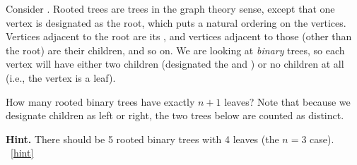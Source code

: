 \documentclass{book}
\begin{document}
\setcounter{project}{177}
\addtocounter{project}{-1}
\begin{activity}[]\label{act-rootedtrees}
\hypertarget{p-1043}{}%
Consider .  Rooted trees are trees in the graph theory sense, except that one vertex is designated as the root, which puts a natural ordering on the vertices.  Vertices adjacent to the root are its , and vertices adjacent to those (other than the root) are their children, and so on.  We are looking at \emph{binary} trees, so each vertex will have either two children (designated the  and ) or no children at all (i.e., the vertex is a leaf).%
\par
\hypertarget{p-1044}{}%
How many rooted binary trees have exactly \(n+1\) leaves?  Note that because we designate children as left or right, the two trees below are counted as distinct.%
\begin{sidebyside}{2}{0.125}{0.125}{0.25}
\begin{sbspanel}{0.25}
\end{sbspanel}
\begin{sbspanel}{0.25}
\end{sbspanel}
\end{sidebyside}
\par\smallskip%
\noindent\textbf{Hint.}\hypertarget{hint-116}{}\quad%
\hypertarget{p-1045}{}%
There should be 5 rooted binary trees with 4 leaves (the \(n = 3\) case).%
~\hfill{\tiny\hyperlink{a-177}{[hint]}\hypertarget{q-177}{}}\end{activity}
\end{document}
